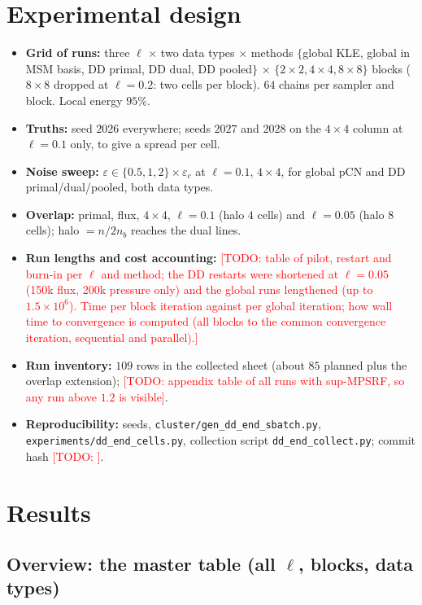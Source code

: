 \documentclass[11pt]{article}
\newcommand{\todo}[1]{\textcolor{red}{[TODO: #1]}}
\begin{document}
\section{Experimental design}\label{sec:design}
\begin{itemize}
\item \textbf{Grid of runs:} three $\ell$ $\times$ two data types $\times$ methods $\{$global KLE, global in MSM basis, DD primal, DD dual, DD pooled$\}$ $\times$ $\{2\times2,4\times4,8\times8\}$ blocks ($8\times8$ dropped at $\ell=0.2$: two cells per block). $64$ chains per sampler and block. Local energy $95\%$.
\item \textbf{Truths:} seed $2026$ everywhere; seeds $2027$ and $2028$ on the $4\times4$ column at $\ell=0.1$ only, to give a spread per cell.
\item \textbf{Noise sweep:} $\varepsilon\in\{0.5,1,2\}\times\varepsilon_c$ at $\ell=0.1$, $4\times4$, for global pCN and DD primal/dual/pooled, both data types.
\item \textbf{Overlap:} primal, flux, $4\times4$, $\ell=0.1$ (halo $4$ cells) and $\ell=0.05$ (halo $8$ cells); halo $=n/2n_b$ reaches the dual lines.
\item \textbf{Run lengths and cost accounting:} \todo{table of pilot, restart and burn-in per $\ell$ and method; the DD restarts were shortened at $\ell=0.05$ (150k flux, 200k pressure only) and the global runs lengthened (up to $1.5\times10^6$). Time per block iteration against per global iteration; how wall time to convergence is computed (all blocks to the common convergence iteration, sequential and parallel).}
\item \textbf{Run inventory:} $109$ rows in the collected sheet (about $85$ planned plus the overlap extension); \todo{appendix table of all runs with sup-MPSRF, so any run above $1.2$ is visible}.
\item \textbf{Reproducibility:} seeds, \texttt{cluster/gen\_dd\_end\_sbatch.py}, \texttt{experiments/dd\_end\_cells.py}, collection script \texttt{dd\_end\_collect.py}; commit hash \todo{}.
\end{itemize}

\section{Results}\label{sec:results}
\subsection{Overview: the master table (all $\ell$, blocks, data types)}
\begin{table}[h]\centering\small
\resizebox{\linewidth}{!}{}
\caption{Error and sd ratios to the global pCN run (same $\ell$, data, $\varepsilon$, truth $2026$): global pCN in the MSM basis and DD primal. Generated from \texttt{master\_table.csv}. \todo{add dual and pooled columns; the dual and pooled $8\times8$ flux rows at $\ell=0.1$ and $0.05$ are excluded from conclusions (\cref{sec:limits}).}}\label{tab:ratios}
\end{table}
\end{document}
